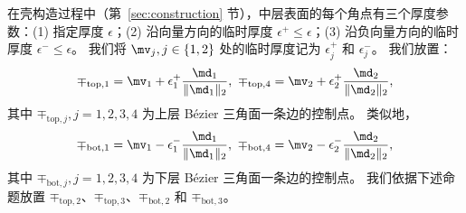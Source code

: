 在壳构造过程中（第~\ref{sec:construction} 节），中层表面的每个角点有三个厚度参数：(1) 指定厚度 $\epsilon$；(2) 沿向量方向的临时厚度 $\epsilon^{+} \leq \epsilon$；(3) 沿负向量方向的临时厚度 $\epsilon^{-} \leq \epsilon$。
%
我们将 $\mv_j, j\in\{1,2\}$ 处的临时厚度记为 $\epsilon_j^{+}$ 和 $\epsilon_j^{-}$。
%
我们放置：
$$\mp_{\text{top},1} = \mv_1 + \epsilon_1^{+} \frac{\md_1}{\|\md_1\|_2}, \,\, \mp_{\text{top},4} = \mv_2 + \epsilon_2^{+} \frac{\md_2}{\|\md_2\|_2},$$ 其中 $\mp_{\text{top},j}, j=1,2,3,4$ 为上层 B\'{e}zier 三角面一条边的控制点。
类似地，$$\mp_{\text{bot},1} = \mv_1 - \epsilon_1^{-} \frac{\md_1}{\|\md_1\|_2}, \,\,\mp_{\text{bot},4} = \mv_2 - \epsilon_2^{-} \frac{\md_2}{\|\md_2\|_2},$$ 其中 $\mp_{\text{bot},j}, j=1,2,3,4$ 为下层 B\'{e}zier 三角面一条边的控制点。
%
我们依据下述命题放置 $\mp_{\text{top},2}$、$\mp_{\text{top},3}$、$\mp_{\text{bot},2}$ 和 $\mp_{\text{bot},3}$。
%
